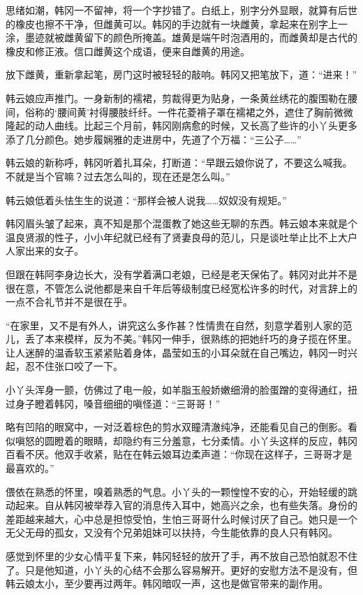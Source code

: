 思绪如潮，韩冈一不留神，将一个字抄错了。白纸上，别字分外显眼，就算有后世的橡皮也擦不干净，但雌黄可以。韩冈的手边就有一块雌黄，拿起来在别字上一涂，墨迹就被雌黄留下的颜色所掩盖。雄黄是端午时泡酒用的，而雌黄却是古代的橡皮和修正液。信口雌黄这个成语，便来自雌黄的用途。

放下雌黄，重新拿起笔，房门这时被轻轻的敲响。韩冈又把笔放下，道：“进来！”

韩云娘应声推门。一身新制的襦裙，剪裁得更为贴身，一条黄丝绣花的腹围勒在腰间，俗称的‘腰间黄’衬得腰肢纤纤。一件花菱褙子罩在襦裙之外，遮住了胸前微微隆起的动人曲线。比起三个月前，韩冈刚病愈的时候，又长高了些许的小丫头更多添了几分颜色。她步履娴雅的走进房中，先道了个万福：“三公子……”

韩云娘的新称呼，韩冈听着扎耳朵，打断道：“早跟云娘你说了，不要这么喊我。不就是当个官嘛？过去怎么叫的，现在还是怎么叫。”

韩云娘低着头怯生生的说道：“那样会被人说我……奴奴没有规矩。”

韩冈眉头皱了起来，真不知是那个混蛋教了她这些无聊的东西。韩云娘本来就是个温良贤淑的性子，小小年纪就已经有了贤妻良母的范儿，只是谈吐举止比不上大户人家出来的女子。

但跟在韩阿李身边长大，没有学着满口老娘，已经是老天保佑了。韩冈对此并不是很在意，不管怎么说他都是来自千年后等级制度已经宽松许多的时代，对言辞上的一点不合礼节并不是很在乎。

“在家里，又不是有外人，讲究这么多作甚？性情贵在自然，刻意学着别人家的范儿，丢了本来模样，反为不美。”韩冈一伸手，很熟练的把她纤巧的身子揽在怀里。让人迷醉的温香软玉紧紧贴着身体，晶莹如玉的小耳朵就在自己嘴边，韩冈一时兴起，忍不住张口咬了一下。

小丫头浑身一颤，仿佛过了电一般，如羊脂玉般娇嫩细滑的脸蛋蹭的变得通红，扭过身子瞪着韩冈，嗓音细细的嗔怪道：“三哥哥！”

略有凹陷的眼窝中，一对泛着棕色的剪水双瞳清澈纯净，还能看见自己的倒影。看似嗔怒的圆瞪着的眼睛，却隐约有三分羞意，七分柔情。小丫头这样的反应，韩冈百看不厌。他双手收紧，贴在在韩云娘耳边柔声道：“你现在这样子，三哥哥才是最喜欢的。”

偎依在熟悉的怀里，嗅着熟悉的气息。小丫头的一颗惶惶不安的心，开始轻缓的跳动起来。自从韩冈被举荐入官的消息传入耳中，她高兴之余，也有些失落。身份的差距越来越大，心中总是担惊受怕，生怕三哥哥什么时候讨厌了自己。她只是一个无父无母的孤女，又没有个兄弟姐妹可以扶持，今生能依靠的良人只有韩冈。

感觉到怀里的少女心情平复下来，韩冈轻轻的放开了手，再不放自己恐怕就忍不住了。只是他知道，小丫头的心结不会那么容易解开。更好的安慰方法不是没有，但韩云娘太小，至少要再过两年。韩冈暗叹一声，这也是做官带来的副作用。

